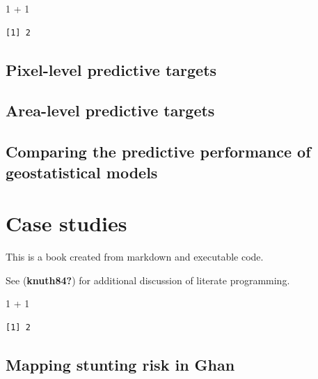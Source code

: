 \documentclass[
  letterpaper,
]{krantz}
\newenvironment{Shaded}{\begin{snugshade}}{\end{snugshade}}
\newcommand{\DecValTok}[1]{\textcolor[rgb]{0.68,0.00,0.00}{#1}}
\newcommand{\SpecialCharTok}[1]{\textcolor[rgb]{0.37,0.37,0.37}{#1}}
\begin{document}
\begin{Shaded}
\begin{Highlighting}[]
\DecValTok{1} \SpecialCharTok{+} \DecValTok{1}
\end{Highlighting}
\end{Shaded}

\begin{verbatim}
[1] 2
\end{verbatim}

\hypertarget{pixel-level-predictive-targets}{%
\section{Pixel-level predictive
targets}\label{pixel-level-predictive-targets}}

\hypertarget{area-level-predictive-targets}{%
\section{Area-level predictive
targets}\label{area-level-predictive-targets}}

\hypertarget{comparing-the-predictive-performance-of-geostatistical-models}{%
\section{Comparing the predictive performance of geostatistical
models}\label{comparing-the-predictive-performance-of-geostatistical-models}}


\hypertarget{sec-case-studies}{%
\chapter{Case studies}\label{sec-case-studies}}

This is a book created from markdown and executable code.

See (\textbf{knuth84?}) for additional discussion of literate
programming.

\begin{Shaded}
\begin{Highlighting}[]
\DecValTok{1} \SpecialCharTok{+} \DecValTok{1}
\end{Highlighting}
\end{Shaded}

\begin{verbatim}
[1] 2
\end{verbatim}

\hypertarget{mapping-stunting-risk-in-ghan}{%
\section{Mapping stunting risk in
Ghan}\label{mapping-stunting-risk-in-ghan}}
\end{document}
